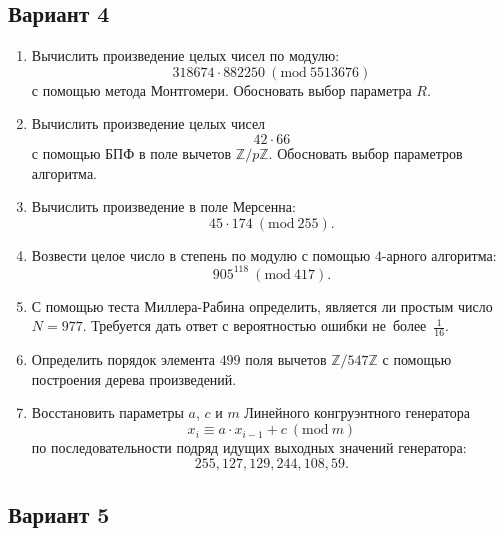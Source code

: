\documentclass[14pt]{extarticle}
\begin{document}
\clearpage	\subsection{Вариант 4}
	\begin{enumerate}
		\item Вычислить произведение целых чисел по модулю: \[318674 \cdot 882250\ (\textrm{mod}\ 5513676)\] с помощью метода Монтгомери. Обосновать выбор параметра $R$.
		\item Вычислить произведение целых чисел \[42 \cdot 66\] с помощью БПФ в поле вычетов $\mathbb{Z}/p\mathbb{Z}$. Обосновать выбор параметров алгоритма.
		\item Вычислить произведение в поле Мерсенна: \[45 \cdot 174\ (\textrm{mod}\ 255).\]
		\item Возвести целое число в степень по модулю с помощью $4$-арного алгоритма: \[905^{118}\ (\textrm{mod}\ 417).\]
		\item С помощью теста Миллера-Рабина определить, является ли простым число $N = 977$. Требуется дать ответ с вероятностью ошибки не~более~$\frac{1}{16}$.
		\item Определить порядок элемента $499$ поля вычетов $\mathbb{Z}/547\mathbb{Z}$ с помощью построения дерева произведений.
		\item Восстановить параметры $a$, $c$ и $m$ Линейного конгруэнтного генератора \[x_i \equiv a \cdot x_{i-1} + c\ (\textrm{mod}\ m)\] по последовательности подряд идущих выходных значений генератора: \[255, 127, 129, 244, 108, 59.\]
	\end{enumerate}
\clearpage	\subsection{Вариант 5}
\end{document}
